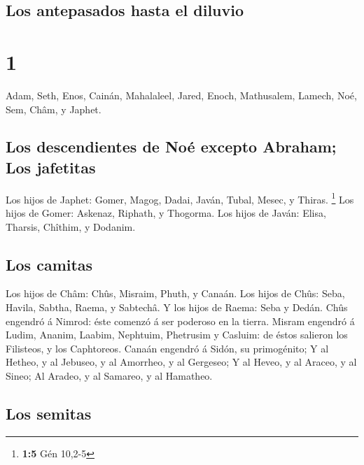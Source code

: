 \hypertarget{los-antepasados-hasta-el-diluvio}{%
\subsection{Los antepasados \hspace{0pt}\hspace{0pt}hasta el
diluvio}\label{los-antepasados-hasta-el-diluvio}}

\hypertarget{section}{%
\section{1}\label{section}}

 Adam, Seth, Enos,  Cainán, Mahalaleel,
Jared,  Enoch, Mathusalem, Lamech,  Noé,
Sem, Châm, y Japhet.

\hypertarget{los-descendientes-de-nouxe9-excepto-abraham-los-jafetitas}{%
\subsection{Los descendientes de Noé excepto Abraham; Los
jafetitas}\label{los-descendientes-de-nouxe9-excepto-abraham-los-jafetitas}}

 Los hijos de Japhet: Gomer, Magog, Dadai, Javán, Tubal,
Mesec, y Thiras. \footnote{\textbf{1:5} Gén 10,2-5}  Los
hijos de Gomer: Askenaz, Riphath, y Thogorma.  Los hijos
de Javán: Elisa, Tharsis, Chîthim, y Dodanim.

\hypertarget{los-camitas}{%
\subsection{Los camitas}\label{los-camitas}}

 Los hijos de Châm: Chûs, Misraim, Phuth, y Canaán.
 Los hijos de Chûs: Seba, Havila, Sabtha, Raema, y
Sabtechâ. Y los hijos de Raema: Seba y Dedán.  Chûs
engendró á Nimrod: éste comenzó á ser poderoso en la tierra.
 Misram engendró á Ludim, Ananim, Laabim, Nephtuim,
 Phetrusim y Casluim: de éstos salieron los Filisteos, y
los Caphtoreos.  Canaán engendró á Sidón, su primogénito;
 Y al Hetheo, y al Jebuseo, y al Amorrheo, y al Gergeseo;
 Y al Heveo, y al Araceo, y al Sineo;  Al
Aradeo, y al Samareo, y al Hamatheo.

\hypertarget{los-semitas}{%
\subsection{Los semitas}\label{los-semitas}}


